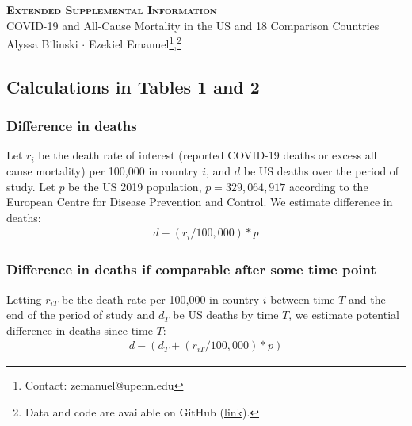 \documentclass[
]{article}
\author{}
\date{\vspace{-2.5em}}
\begin{document}
\begin{center} 
    \textbf{\scshape \LARGE Extended Supplemental Information}\\  \vspace{2mm}
    {\large COVID-19 and All-Cause Mortality in the US and 18 Comparison Countries}\\ \vspace{2mm} 
    {\large Alyssa Bilinski $\cdot$ Ezekiel Emanuel\footnote{Contact: zemanuel@upenn.edu},\footnote{Data and code are available on GitHub (\href{https://github.com/abilinski/MortalityCOVID19}{link}).}} \\
\end{center}

\vspace{-0.50em}

\bigskip

\hypertarget{calculations-in-tables-1-and-2}{%
\subsection{Calculations in Tables 1 and
2}\label{calculations-in-tables-1-and-2}}

\hypertarget{difference-in-deaths}{%
\subsubsection{Difference in deaths}\label{difference-in-deaths}}

Let \(r_i\) be the death rate of interest (reported COVID-19 deaths or
excess all cause mortality) per 100,000 in country \(i\), and \(d\) be
US deaths over the period of study. Let \(p\) be the US 2019 population,
\(p=329,064,917\) according to the European Centre for Disease
Prevention and Control. We estimate difference in deaths: \begin{align}
d - \left(r_i/100,000\right)*p
\end{align}

\hypertarget{difference-in-deaths-if-comparable-after-some-time-point}{%
\subsubsection{Difference in deaths if comparable after some time
point}\label{difference-in-deaths-if-comparable-after-some-time-point}}

Letting \(r_{iT}\) be the death rate per 100,000 in country \(i\)
between time \(T\) and the end of the period of study and \(d_T\) be US
deaths by time \(T\), we estimate potential difference in deaths since
time \(T\): \begin{align}
d - \left(d_T + \left(r_{iT}/100,000\right)*p\right)
\end{align}
\end{document}
